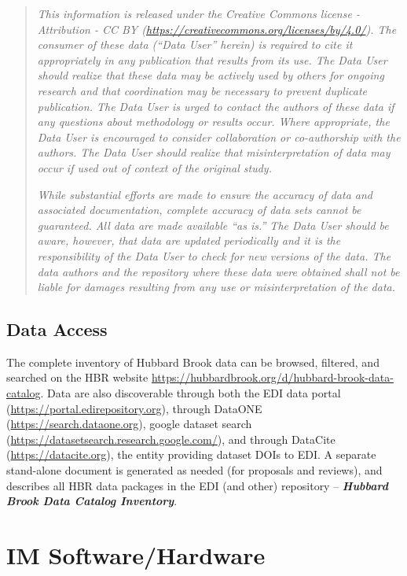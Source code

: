 \documentclass[
  letterpaper,
  DIV=11,
  numbers=noendperiod]{scrreprt}
\begin{document}
\begin{quote}
\emph{This information is released under the Creative Commons license -
Attribution - CC BY
(\url{https://creativecommons.org/licenses/by/4.0/}). The consumer of
these data (``Data User'' herein) is required to cite it appropriately
in any publication that results from its use. The Data User should
realize that these data may be actively used by others for ongoing
research and that coordination may be necessary to prevent duplicate
publication. The Data User is urged to contact the authors of these data
if any questions about methodology or results occur. Where appropriate,
the Data User is encouraged to consider collaboration or co-authorship
with the authors. The Data User should realize that misinterpretation of
data may occur if used out of context of the original study.}

\emph{While substantial efforts are made to ensure the accuracy of data
and associated documentation, complete accuracy of data sets cannot be
guaranteed. All data are made available ``as is.'' The Data User should
be aware, however, that data are updated periodically and it is the
responsibility of the Data User to check for new versions of the data.
The data authors and the repository where these data were obtained shall
not be liable for damages resulting from any use or misinterpretation of
the data.}
\end{quote}

\subsection{Data Access}\label{data-access}

The complete inventory of Hubbard Brook data can be browsed, filtered,
and searched on the HBR website
\url{https://hubbardbrook.org/d/hubbard-brook-data-catalog}. Data are
also discoverable through both the EDI data portal
(\href{https://portal.edirepository.org/}{https://portal.edirepository.org}),
through DataONE
(\href{https://search.dataone.org/}{https://search.dataone.org}), google
dataset search (\url{https://datasetsearch.research.google.com/}), and
through DataCite (\href{https://datacite.org/}{https://datacite.org}),
the entity providing dataset DOIs to EDI. A separate stand-alone
document is generated as needed (for proposals and reviews), and
describes all HBR data packages in the EDI (and other) repository --
\textbf{\emph{Hubbard Brook Data Catalog Inventory}}.

\section{IM Software/Hardware}\label{im-softwarehardware}
\end{document}
